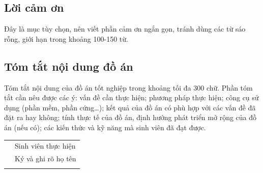 \thispagestyle{empty}

\subsection*{\centering Lời cảm ơn}
Đây là mục tùy chọn, nên viết phần cảm ơn ngắn gọn, tránh dùng các từ sáo rỗng, giới hạn trong khoảng 100-150 từ. 

\subsection*{\centering Tóm tắt nội dung đồ án}
Tóm tắt nội dung của đồ án tốt nghiệp trong khoảng tối đa 300 chữ. Phần tóm tắt cần nêu được các ý: vấn đề cần thực hiện; phương pháp thực hiện; công cụ sử dụng (phần mềm, phần cứng…); kết quả của đồ án có phù hợp với các vấn đề đã đặt ra hay không; tính thực tế của đồ án, định hướng phát triển mở rộng của đồ án (nếu có); các kiến thức và kỹ năng mà sinh viên đã đạt được.


\vfill
\noindent
\begin{tabularx}{\textwidth}{>{\centering\arraybackslash}X>{\centering\arraybackslash}X}
    \centering
    & Sinh viên thực hiện \\
    \centering
    &\fontsize{10pt}{0}\selectfont Ký và ghi rõ họ tên \\
    \centering
\end{tabularx}
  
\thesisbreak